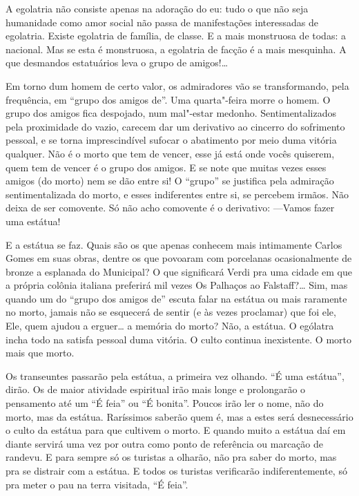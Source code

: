 
A egolatria não consiste apenas na adoração do eu: tudo o que não seja
humanidade como amor social não passa de manifestações interessadas de
egolatria. Existe egolatria de família, de classe. E a mais monstruosa
de todas: a nacional. Mas se esta é monstruosa, a egolatria de facção é
a mais mesquinha. A que desmandos estatuários leva o grupo de amigos!\ldots{}

Em torno dum homem de certo valor, os admiradores vão se transformando,
pela frequência, em ``grupo dos amigos de''. Uma quarta"-feira morre o
homem. O grupo dos amigos fica despojado, num mal"-estar medonho.
Sentimentalizados pela proximidade do vazio, carecem dar um derivativo
ao cincerro do sofrimento pessoal, e se torna imprescindível sufocar o
abatimento por meio duma vitória qualquer. Não é o morto que tem de
vencer, esse já está onde vocês quiserem, quem tem de vencer é o grupo
dos amigos. E se note que muitas vezes esses amigos (do morto) nem se
dão entre si! O ``grupo'' se justifica pela admiração sentimentalizada do
morto, e esses indiferentes entre si, se percebem irmãos. Não deixa de
ser comovente. Só não acho comovente é o derivativo: ---Vamos fazer uma
estátua!

E a estátua se faz. Quais são os que apenas conhecem mais intimamente
Carlos Gomes em suas obras, dentre os que povoaram com porcelanas
ocasionalmente de bronze a esplanada do Municipal? O que significará
Verdi pra uma cidade em que a própria colônia italiana preferirá mil
vezes Os Palhaços ao Falstaff?\ldots{} Sim, mas quando um do ``grupo dos
amigos de'' escuta falar na estátua ou mais raramente no morto, jamais
não se esquecerá de sentir (e às vezes proclamar) que foi ele, Ele, quem
ajudou a erguer\ldots{} a memória do morto? Não, a estátua. O ególatra incha
todo na satisfa pessoal duma vitória. O culto continua inexistente. O
morto mais que morto.

Os transeuntes passarão pela estátua, a primeira vez olhando. ``É uma
estátua'', dirão. Os de maior atividade espiritual irão mais longe e
prolongarão o pensamento até um ``É feia'' ou ``É bonita''. Poucos irão ler
o nome, não do morto, mas da estátua. Raríssimos saberão quem é, mas a
estes será desnecessário o culto da estátua para que cultivem o morto. E
quando muito a estátua daí em diante servirá uma vez por outra como
ponto de referência ou marcação de randevu. E para sempre só os turistas
a olharão, não pra saber do morto, mas pra se distrair com a estátua. E
todos os turistas verificarão indiferentemente, só pra meter o pau na
terra visitada, ``É feia''.

